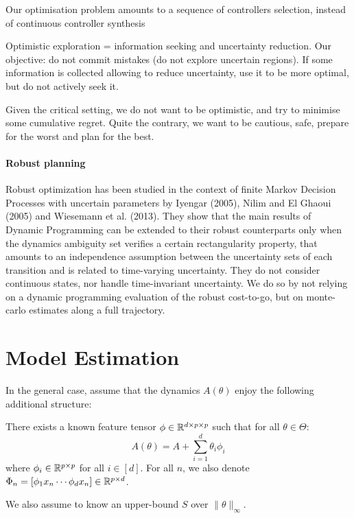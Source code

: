 \documentclass{article}
\begin{document}
Our optimisation problem amounts to a sequence of controllers selection, instead of continuous controller synthesis
    
Optimistic exploration = information seeking and uncertainty reduction. Our objective: do not commit mistakes (do not explore uncertain regions). If some information is collected allowing to reduce uncertainty, use it to be more optimal, but do not actively seek it.

Given the critical setting, we do not want to be optimistic, and try to minimise some cumulative regret. Quite the contrary, we want to be cautious, safe, prepare for the worst and plan for the best. 

\paragraph{Robust planning}
Robust optimization has been studied in the context of finite Markov Decision Processes with uncertain parameters by Iyengar (2005), Nilim and El Ghaoui (2005) and Wiesemann et al. (2013). They show that the main results of Dynamic Programming can be extended to their robust counterparts only when the dynamics ambiguity set verifies a certain rectangularity property, that amounts to an independence assumption between the uncertainty sets of each transition and is related to time-varying uncertainty.
They do not consider continuous states, nor handle time-invariant uncertainty. We do so by not relying on a dynamic programming evaluation of the robust cost-to-go, but on monte-carlo estimates along a full trajectory.

\section{Model Estimation}

\label{sec:estimation}

In the general case, 
 assume that the dynamics $A(\theta)$ enjoy the following additional structure:
\begin{assumption}[Structure]
\label{assumpt:structure}
There exists a known feature tensor $\phi\in \mathbb{R}^{d \times p \times p}$ such that for all $\theta\in\Theta$:
\begin{equation}
    A(\theta) = A + %
    \sum_{i=1}^d \theta_i\phi_i
\end{equation}
where $\phi_i\in\mathbb{R}^{p\times p}$ for all $i\in[d]$. For all $n$, we also denote $\Phi_n = [\phi_1 x_n \cdots \phi_d x_n]\in\mathbb{R}^{p\times d}$.

We also assume to know an upper-bound $S$ over $\|\theta\|_\infty$.
\end{assumption}
\end{document}
